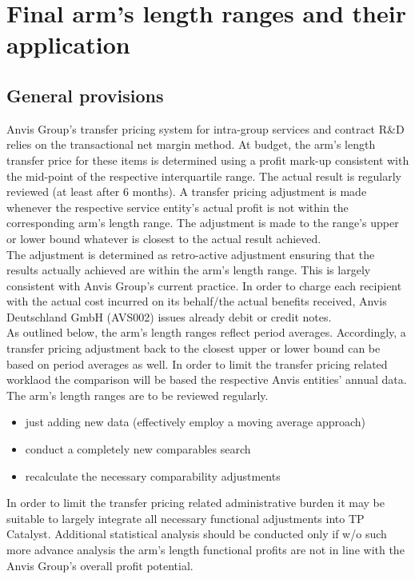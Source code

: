 \documentclass[12pt]{article}
\begin{document}
\pagestyle{fancy}

\rfoot{\footnotesize \thepage}
\section{Final arm's length ranges and their application}
\subsection{General provisions}
Anvis Group's transfer pricing system for intra-group services and contract R\&D relies on the transactional net margin method. At budget, the arm's length transfer price for these items is determined using a profit mark-up consistent with the mid-point of the respective interquartile range. The actual result is regularly reviewed (at least after 6 months). A transfer pricing adjustment is made whenever the respective service entity's actual profit is not within the corresponding arm's length range. The adjustment is made to the range's upper or lower bound whatever is closest to the actual result achieved.\\[0.2cm]
The adjustment is determined as retro-active adjustment ensuring that the results actually achieved are within the arm's length range. This is largely consistent with Anvis Group's current practice. In order to charge each recipient with the actual cost incurred on its behalf/the actual benefits received, Anvis Deutschland GmbH (AVS002) issues already debit or credit notes.\\[0.2cm]
As outlined below, the arm's length ranges reflect period averages. Accordingly, a transfer pricing adjustment back to the closest upper or lower bound can be based on period averages as well. In order to limit the transfer pricing related worklaod the comparison will be based the respective Anvis entities' annual data.\\[0.2cm]
The arm's length ranges are to be reviewed regularly.\begin{itemize}
  \item just adding new data (effectively employ a moving average approach)
  \item conduct a completely new comparables search
  \item recalculate the necessary comparability adjustments
\end{itemize}
In order to limit the transfer pricing related administrative burden it may be suitable to largely integrate all necessary functional adjustments into TP Catalyst. Additional statistical analysis should be conducted only if w/o such more advance analysis the arm's length functional profits are not in line with the Anvis Group's overall profit potential.
\end{document}
